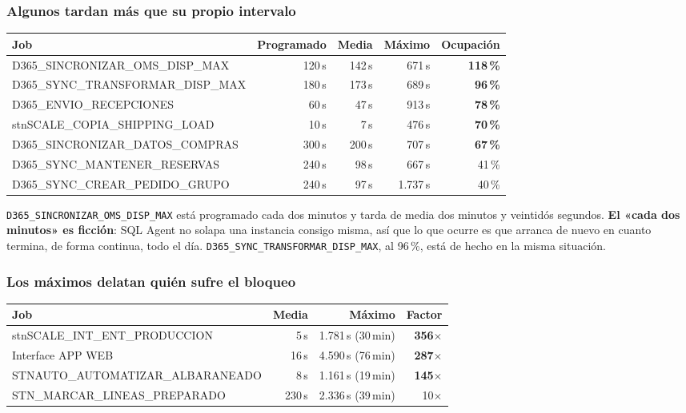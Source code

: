 \documentclass[11pt,a4paper]{article}
\newcommand{\cod}[1]{\texttt{\small #1}}
\newcommand{\critico}[1]{\textcolor{rojo}{\textbf{#1}}}
\newcommand{\aviso}[1]{\textcolor{ambar}{\textbf{#1}}}
\begin{document}
\subsubsection*{Algunos tardan más que su propio intervalo}

\begin{table}[h]
\centering
\small
\begin{tabular}{lrrrr}
\toprule
\textbf{Job} & \textbf{Programado} & \textbf{Media} & \textbf{Máximo} &
\textbf{Ocupación} \\
\midrule
D365\_SINCRONIZAR\_OMS\_DISP\_MAX  & 120\,s & 142\,s & 671\,s  & \critico{118\,\%} \\
D365\_SYNC\_TRANSFORMAR\_DISP\_MAX & 180\,s & 173\,s & 689\,s  & \critico{96\,\%} \\
D365\_ENVIO\_RECEPCIONES           &  60\,s &  47\,s & 913\,s  & \critico{78\,\%} \\
stnSCALE\_COPIA\_SHIPPING\_LOAD    &  10\,s &   7\,s & 476\,s  & \critico{70\,\%} \\
D365\_SINCRONIZAR\_DATOS\_COMPRAS  & 300\,s & 200\,s & 707\,s  & \aviso{67\,\%} \\
D365\_SYNC\_MANTENER\_RESERVAS     & 240\,s &  98\,s & 667\,s  & 41\,\% \\
D365\_SYNC\_CREAR\_PEDIDO\_GRUPO   & 240\,s &  97\,s & 1.737\,s & 40\,\% \\
\bottomrule
\end{tabular}
\end{table}

\cod{D365\_SINCRONIZAR\_OMS\_DISP\_MAX} está programado cada dos minutos y
tarda de media dos minutos y veintidós segundos. \textbf{El «cada dos
minutos» es ficción}: SQL Agent no solapa una instancia consigo misma, así
que lo que ocurre es que arranca de nuevo en cuanto termina, de forma
continua, todo el día. \cod{D365\_SYNC\_TRANSFORMAR\_DISP\_MAX}, al 96\,\%,
está de hecho en la misma situación.

\subsubsection*{Los máximos delatan quién sufre el bloqueo}

\begin{table}[h]
\centering
\small
\begin{tabular}{lrrr}
\toprule
\textbf{Job} & \textbf{Media} & \textbf{Máximo} & \textbf{Factor} \\
\midrule
stnSCALE\_INT\_ENT\_PRODUCCION    &  5\,s & 1.781\,s (30\,min) & \critico{356$\times$} \\
Interface APP WEB                 & 16\,s & 4.590\,s (76\,min) & \critico{287$\times$} \\
STNAUTO\_AUTOMATIZAR\_ALBARANEADO &  8\,s & 1.161\,s (19\,min) & \critico{145$\times$} \\
STN\_MARCAR\_LINEAS\_PREPARADO    & 230\,s & 2.336\,s (39\,min) & 10$\times$ \\
\bottomrule
\end{tabular}
\end{table}
\end{document}
